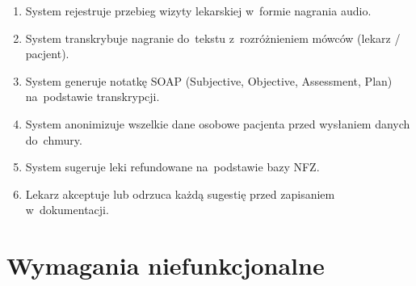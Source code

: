 \begin{enumerate}[label=\textbf{F\arabic*}]
  \item System rejestruje przebieg wizyty lekarskiej w~formie
        nagrania audio.
  \item System transkrybuje nagranie do~tekstu z~rozróżnieniem
        mówców (lekarz / pacjent).
  \item System generuje notatkę SOAP (Subjective, Objective,
        Assessment, Plan) na~podstawie transkrypcji.
  \item System anonimizuje wszelkie dane osobowe pacjenta przed
        wysłaniem danych do~chmury.
  \item System sugeruje leki refundowane na~podstawie bazy NFZ.
  \item Lekarz akceptuje lub odrzuca każdą sugestię przed
        zapisaniem w~dokumentacji.
\end{enumerate}


\section{Wymagania niefunkcjonalne}\label{sec:wymagania-niefunkcjonalne}

